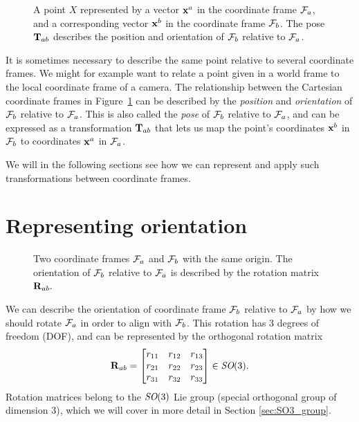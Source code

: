 \begin{figure}[htb]
    \centering
    
    \caption{A point $X$ represented by a vector ${\boldsymbol{\mathbf{x}}}^a$ in the coordinate frame $\mathcal{F}_a$, and a corresponding vector ${\boldsymbol{\mathbf{x}}}^b$ in the coordinate frame $\mathcal{F}_b$.
    The pose ${\boldsymbol{\mathbf{T}}}_{ab}$ describes the position and orientation of $\mathcal{F}_b$ relative to $\mathcal{F}_a$.}
    \label{fig:more_frames}
\end{figure}
It is sometimes necessary to describe the same point relative to several coordinate frames.
We might for example want to relate a point given in a world frame to the local coordinate frame of a camera.
The relationship between the Cartesian coordinate frames in Figure~\ref{fig:more_frames} can be described by the \emph{position} and \emph{orientation} of $\mathcal{F}_b$ relative to $\mathcal{F}_a$.
This is also called the \emph{pose} of $\mathcal{F}_b$ relative to $\mathcal{F}_a$, and can be expressed as a transformation ${\boldsymbol{\mathbf{T}}}_{ab}$ that lets us map the point's coordinates ${\boldsymbol{\mathbf{x}}}^b$ in $\mathcal{F}_b$ to coordinates ${\boldsymbol{\mathbf{x}}}^a$ in $\mathcal{F}_a$.

We will in the following sections see how we can represent and apply such transformations between coordinate frames.


\section{Representing orientation} \label{sec:orientation}
\begin{figure}[htb]
    \centering
    
    \caption{Two coordinate frames $\mathcal{F}_a$ and $\mathcal{F}_b$ with the same origin. The orientation of $\mathcal{F}_b$ relative to $\mathcal{F}_a$ is described by the rotation matrix ${\boldsymbol{\mathbf{R}}}_{ab}.$}
    \label{fig:rotated_frames}
\end{figure}

We can describe the orientation of coordinate frame $\mathcal{F}_b$ relative to $\mathcal{F}_a$ by how we should rotate $\mathcal{F}_a$ in order to align with $\mathcal{F}_b$.
This rotation has 3 degrees of freedom (DOF), and can be represented by the orthogonal rotation matrix
\begin{equation}
  {\boldsymbol{\mathbf{R}}}_{ab} = 
  \begin{bmatrix}
  r_{11} & r_{12} & r_{13}\\
  r_{21} & r_{22} & r_{23}\\
  r_{31} & r_{32} & r_{33}
  \end{bmatrix}
  \in \textit{SO}(3).
\end{equation}
Rotation matrices belong to the $\textit{SO}(3)$ Lie group (special orthogonal group of dimension 3), which we will cover in more detail in Section \ref{sec:SO3_group}.

